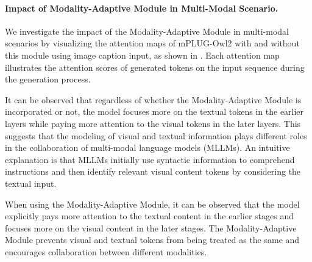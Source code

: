 \documentclass[10pt,twocolumn,letterpaper]{article}
\newcommand{\modelname}{mPLUG-Owl2\xspace}
\begin{document}
\paragraph{Impact of Modality-Adaptive Module in Multi-Modal Scenario.}





We investigate the impact of the Modality-Adaptive Module in multi-modal scenarios by visualizing the attention maps of \modelname with and without this module using image caption input, as shown in . Each attention map illustrates the attention scores of generated tokens on the input sequence during the generation process.

It can be observed that regardless of whether the Modality-Adaptive Module is incorporated or not, the model focuses more on the textual tokens in the earlier layers while paying more attention to the visual tokens in the later layers. This suggests that the modeling of visual and textual information plays different roles in the collaboration of multi-modal language models (MLLMs). An intuitive explanation is that MLLMs initially use syntactic information to comprehend instructions and then identify relevant visual content tokens by considering the textual input.

When using the Modality-Adaptive Module, it can be observed that the model explicitly pays more attention to the textual content in the earlier stages and focuses more on the visual content in the later stages. The Modality-Adaptive Module prevents visual and textual tokens from being treated as the same and encourages collaboration between different modalities.
\end{document}
